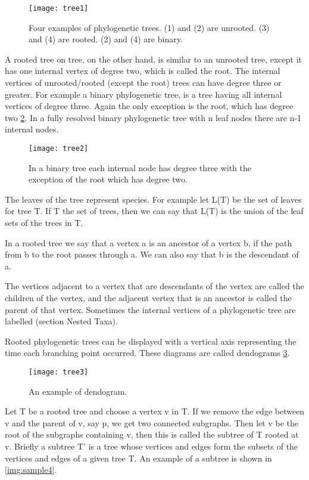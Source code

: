 \begin{figure}[!htbp] 
  \center
  \texttt{[image: tree1]}
  \caption[w]{Four examples of phylogenetic trees. (1) and (2) are unrooted. (3) and 
(4) are rooted. (2) and (4) are binary. } 
  \label{img:sample1}  
\end{figure}

A rooted tree on tree, on the other hand, is similar to an unrooted 
tree, except it has one internal vertex of degree two, which is called the 
root. The internal vertices of unrooted/rooted (except the root) trees can 
have degree three or greater. For example a binary phylogenetic tree, is a 
tree having all internal vertices of degree three. Again the only exception is 
the root, which has degree two \ref{img:sample2}. In a fully resolved binary 
phylogenetic tree with n leaf nodes there are n-1 internal nodes. 

\begin{figure}[!htbp] 
  \center
  \texttt{[image: tree2]}
  \caption[w]{In a binary tree each internal node has degree three with the 
exception of the root which has degree two.} 
  \label{img:sample2}  
\end{figure}

The leaves of the tree represent species. For example let L(T) be the 
set of leaves for tree T. If T the set of trees, then we can say that L(T) is the 
union of the leaf sets of the trees in T. 

In a rooted tree we say that a vertex a is an ancestor of a vertex b, if 
the path from b to the root passes through a. We can also say that b is the 
descendant of a.  

The vertices adjacent to a vertex that are descendants of the vertex 
are called the children of the vertex, and the adjacent vertex that is an 
ancestor is called the parent of that vertex. Sometimes the internal 
vertices of a phylogenetic tree are labelled (section Nested Taxa). 

Rooted phylogenetic trees can be displayed with a vertical axis 
representing the time each branching point occurred. These diagrams are 
called dendograms \ref{img:sample3}. 

\begin{figure}[!htbp] 
  \center
  \texttt{[image: tree3]}
  \caption[w]{An example of dendogram.} 
  \label{img:sample3}  
\end{figure}

Let T be a rooted tree and choose a vertex v in T. If we remove the 
edge between v and the parent of v, say p, we get two connected 
subgraphs. Then let v be the root of the subgraphs containing v, then this 
is called the subtree of T rooted at v. Briefly a subtree T' is a tree whose 
vertices and edges form the subsets of the vertices and edges of a given 
tree T. An example of a subtree is shown in \ref{img:sample4}.

